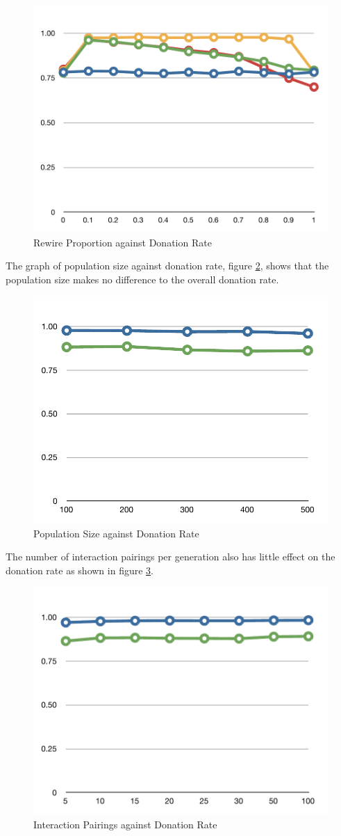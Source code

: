\begin{figure}[htbp]
	\centering
	\includegraphics[width=0.4\linewidth]{img/testing_rewire_proportion.pdf}
	\caption{Rewire Proportion against Donation Rate}
	\label{fig:testing_rewire_proportion}
\end{figure}

The graph of population size against donation rate, figure \ref{fig:testing_population_size}, shows that the population size makes no difference to the overall donation rate.

\begin{figure}[htbp]
	\centering
	\includegraphics[width=0.4\linewidth]{img/testing_population_size.pdf}
	\caption{Population Size against Donation Rate}
	\label{fig:testing_population_size}
\end{figure}

The number of interaction pairings per generation also has little effect on the donation rate as shown in figure \ref{fig:testing_interaction_pairings}.

\begin{figure}[htbp]
	\centering
	\includegraphics[width=0.4\linewidth]{img/testing_interaction_pairings.pdf}
	\caption{Interaction Pairings against Donation Rate}
	\label{fig:testing_interaction_pairings}
\end{figure}

